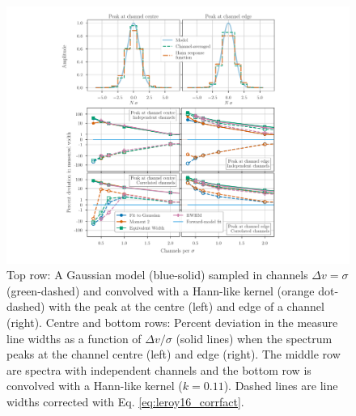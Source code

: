 \documentclass{rnaastex}
\begin{document}


\begin{figure}
\includegraphics[width=\textwidth]{combined_figure}
\caption{\label{fig:width_recovery_comparison} Top row: A Gaussian model (blue-solid) sampled in channels $\Delta v = \sigma$ (green-dashed) and convolved with a Hann-like kernel (orange dot-dashed) with the peak at the centre (left) and edge of a channel (right). Centre and bottom rows: Percent deviation in the measure line widths as a function of $\Delta v / \sigma$ (solid lines) when the spectrum peaks at the channel centre (left) and edge (right). The middle row are spectra with independent channels and the bottom row is convolved with a Hann-like kernel ($k=0.11$). Dashed lines are line widths corrected with Eq. \ref{eq:leroy16_corrfact}.}
\end{figure}
\end{document}
